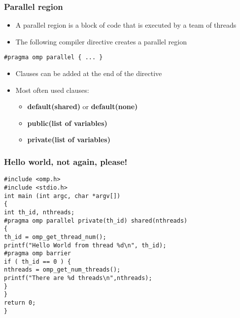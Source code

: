 \documentclass{beamer}
\begin{document}
\begin{frame}
\frametitle{Parallel region}

\begin{block}{}
\begin{itemize}
\item A parallel region is a block of code that is executed by a team of threads

\item The following compiler directive creates a parallel region
\end{itemize}

\noindent
\begin{verbatim}
#pragma omp parallel { ... }
\end{verbatim}
\begin{itemize}
\item Clauses can be added at the end of the directive

\item Most often used clauses:
\begin{itemize}

 \item \textbf{default(shared)} or \textbf{default(none)}

 \item \textbf{public(list of variables)}

 \item \textbf{private(list of variables)}
\end{itemize}

\noindent
\end{itemize}

\noindent
\end{block}
\end{frame}

\begin{frame}
\frametitle{Hello world, not again, please!}

\begin{block}{}
\begin{verbatim}
#include <omp.h>
#include <stdio.h>
int main (int argc, char *argv[])
{
int th_id, nthreads;
#pragma omp parallel private(th_id) shared(nthreads)
{
th_id = omp_get_thread_num();
printf("Hello World from thread %d\n", th_id);
#pragma omp barrier
if ( th_id == 0 ) {
nthreads = omp_get_num_threads();
printf("There are %d threads\n",nthreads);
}
}
return 0;
}
\end{verbatim}

\end{block}
\end{frame}
\end{document}
